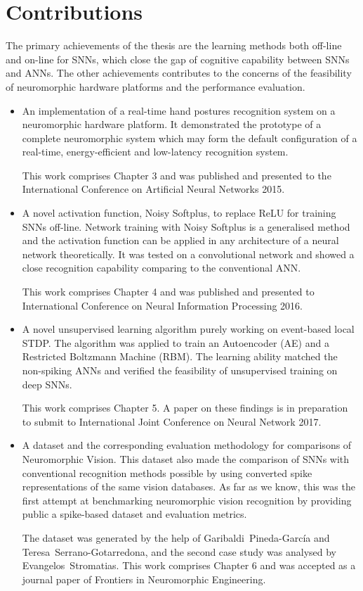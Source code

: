 \section{Contributions}
The primary achievements of the thesis are the learning methods both off-line and on-line for SNNs, which close the gap of cognitive capability between SNNs and ANNs.
The other achievements contributes to the concerns of the feasibility of neuromorphic hardware platforms and the performance evaluation.
\begin{itemize}
	\item 
	An implementation of a real-time hand postures recognition system on a neuromorphic hardware platform.
	It demonstrated the prototype of a complete neuromorphic system which may form the default configuration of a real-time, energy-efficient and low-latency recognition system.
	
	This work comprises Chapter 3 and was published and presented to the International Conference on Artificial Neural Networks 2015.
	
	\item 
	A novel activation function, Noisy Softplus, to replace ReLU for training SNNs off-line.
	Network training with Noisy Softplus is a generalised method and the activation function can be applied in any architecture of a neural network theoretically.
	It was tested on a convolutional network and showed a close recognition capability comparing to the conventional ANN. 

	This work comprises Chapter 4 and was published and presented to International Conference on Neural Information Processing 2016.

	\item 
	A novel unsupervised learning algorithm purely working on event-based local STDP.
	The algorithm was applied to train an Autoencoder (AE) and a Restricted Boltzmann Machine (RBM).
	The learning ability matched the non-spiking ANNs and verified the feasibility of unsupervised training on deep SNNs. 
	
	This work comprises Chapter 5.
	A paper on these findings is in preparation to submit to International Joint Conference on Neural Network 2017.
	
	\item 
	A dataset and the corresponding evaluation methodology for comparisons of Neuromorphic Vision.
	This dataset also made the comparison of SNNs with conventional recognition methods possible by using converted spike representations of the same vision databases.
	As far as we know, this was the first attempt at benchmarking neuromorphic vision recognition by providing public a spike-based dataset and evaluation metrics.
	
	The dataset was generated by the help of Garibaldi~Pineda-Garc\'ia and Teresa~Serrano-Gotarredona, and the second case study was analysed by Evangelos~Stromatias.
	This work comprises Chapter 6 and was accepted as a journal paper of Frontiers in Neuromorphic Engineering.
\end{itemize}

